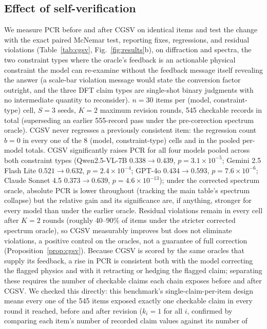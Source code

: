 \documentclass[pdflatex,sn-nature]{sn-jnl}
\begin{document}
\subsection*{Effect of self-verification}
We measure PCR before and after CGSV on identical items and test the change with the
exact paired McNemar test, reporting fixes, regressions, and residual violations
(Table~\ref{tab:cgsv}, Fig.~\ref{fig:results}b), on diffraction and spectra, the two constraint types where
the oracle's feedback is an actionable physical constraint the model can re-examine
without the feedback message itself revealing the answer (a scale-bar violation
message would state the conversion factor outright, and the three DFT claim types are
single-shot binary judgments with no intermediate quantity to reconsider). $n=30$
items per (model, constraint-type) cell, $S=3$ seeds, $K=2$ maximum revision rounds, 545
checkable records in total (superseding an earlier 555-record pass under the
pre-correction spectrum oracle). CGSV never regresses a previously consistent item: the
regression count $b=0$ in every one of the 8 (model, constraint-type) cells and in the
pooled per-model totals. CGSV significantly raises PCR for all four models pooled across both
constraint types (Qwen2.5-VL-7B $0.338\!\to\!0.439$, $p=3.1\times10^{-5}$; Gemini 2.5
Flash Lite $0.521\!\to\!0.632$, $p=2.4\times10^{-4}$; GPT-4o
$0.434\!\to\!0.593$, $p=7.6\times10^{-6}$; Claude Sonnet 4.5 $0.373\!\to\!0.639$,
$p=4.6\times10^{-13}$); under the corrected spectrum oracle, absolute PCR is lower
throughout (tracking the main table's spectrum collapse) but the relative gain and its
significance are, if anything, stronger for every model than under the earlier oracle.
Residual violations remain in every cell after $K=2$ rounds (roughly 40--90\% of
items under the stricter corrected spectrum oracle), so CGSV measurably improves but does not eliminate violations, a positive
control on the oracles, not a guarantee of full correction (Proposition~\ref{prop:cgsv}).
Because CGSV is scored by the same oracles that supply its feedback, a rise in PCR is
consistent both with the model correcting the flagged physics and with it retracting or
hedging the flagged claim; separating these requires the number of checkable claims each
chain exposes before and after CGSV. We checked this directly: this benchmark's
single-claim-per-item design means every one of the 545 items exposed exactly one
checkable claim in every round it reached, before and after revision ($k_i=1$ for all $i$,
confirmed by comparing each item's number of recorded claim values against its number of
\end{document}
